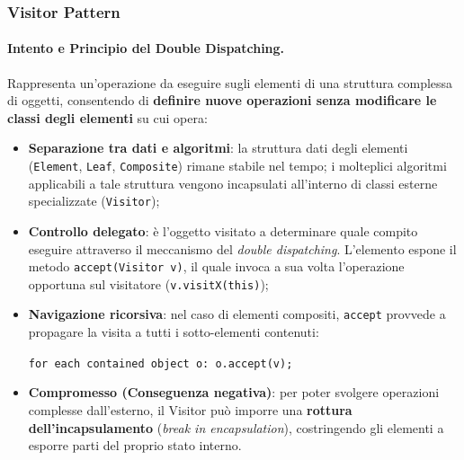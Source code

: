 \documentclass[12pt]{extarticle}
\begin{document}
\subsubsection{Visitor Pattern}

\paragraph{Intento e Principio del Double Dispatching.}
Rappresenta un'operazione da eseguire sugli elementi di una struttura complessa di oggetti, consentendo di \textbf{definire nuove operazioni senza modificare le classi degli elementi} su cui opera:
\begin{itemize}
    \item \textbf{Separazione tra dati e algoritmi}: la struttura dati degli elementi (\texttt{Element}, \texttt{Leaf}, \texttt{Composite}) rimane stabile nel tempo; i molteplici algoritmi applicabili a tale struttura vengono incapsulati all'interno di classi esterne specializzate (\texttt{Visitor});
    \item \textbf{Controllo delegato}: è l'oggetto visitato a determinare quale compito eseguire attraverso il meccanismo del \textit{double dispatching}. L'elemento espone il metodo \texttt{accept(Visitor v)}, il quale invoca a sua volta l'operazione opportuna sul visitatore (\texttt{v.visitX(this)});
    \item \textbf{Navigazione ricorsiva}: nel caso di elementi compositi, \texttt{accept} provvede a propagare la visita a tutti i sotto-elementi contenuti:
    \begin{center}
        \texttt{for each contained object o: o.accept(v);}
    \end{center}
    \item \textbf{Compromesso (Conseguenza negativa)}: per poter svolgere operazioni complesse dall'esterno, il Visitor può imporre una \textbf{rottura dell'incapsulamento} (\textit{break in encapsulation}), costringendo gli elementi a esporre parti del proprio stato interno.
\end{itemize}
\end{document}
